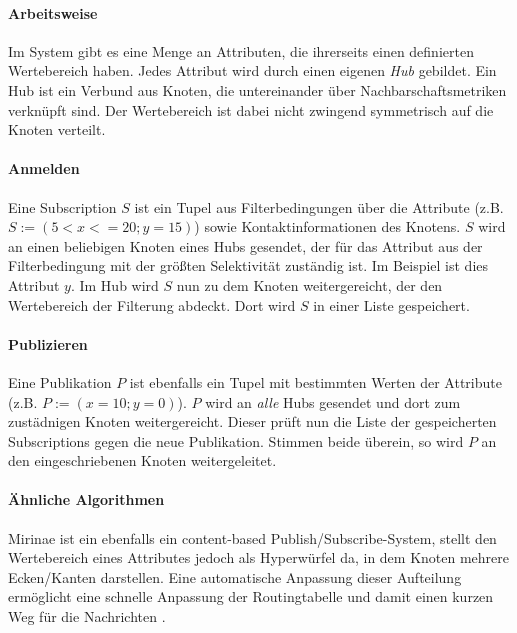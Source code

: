 \paragraph*{Arbeitsweise}
Im System gibt es eine Menge an Attributen, die ihrerseits einen definierten Wertebereich haben. Jedes Attribut wird durch einen eigenen \emph{Hub} gebildet. Ein Hub ist ein Verbund aus Knoten, die untereinander über Nachbarschaftsmetriken verknüpft sind. Der Wertebereich ist dabei nicht zwingend symmetrisch auf die Knoten verteilt.

\paragraph*{Anmelden}
Eine Subscription $S$ ist ein Tupel aus Filterbedingungen über die Attribute (z.B. $S := (5 < x <= 20; y = 15)$) sowie Kontaktinformationen des Knotens. $S$ wird an einen beliebigen Knoten eines Hubs gesendet, der für das Attribut aus der Filterbedingung mit der größten Selektivität zuständig ist. Im Beispiel ist dies Attribut $y$. Im Hub wird $S$ nun zu dem Knoten weitergereicht, der den Wertebereich der Filterung abdeckt. Dort wird $S$ in einer Liste gespeichert.

\paragraph*{Publizieren}
Eine Publikation $P$ ist ebenfalls ein Tupel mit bestimmten Werten der Attribute (z.B. $P := (x = 10; y = 0)$). $P$ wird an \emph{alle} Hubs gesendet und dort zum zustädnigen Knoten weitergereicht. Dieser prüft nun die Liste der gespeicherten Subscriptions gegen die neue Publikation. Stimmen beide überein, so wird $P$ an den eingeschriebenen Knoten weitergeleitet.


\paragraph*{Ähnliche Algorithmen}
Mirinae ist ein ebenfalls ein content-based Publish/Subscribe-System, stellt den Wertebereich eines Attributes jedoch als Hyperwürfel da, in dem Knoten mehrere Ecken/Kanten darstellen. Eine automatische Anpassung dieser Aufteilung ermöglicht eine schnelle Anpassung der Routingtabelle und damit einen kurzen Weg für die Nachrichten \cite{Choi2005Mirinae}.
